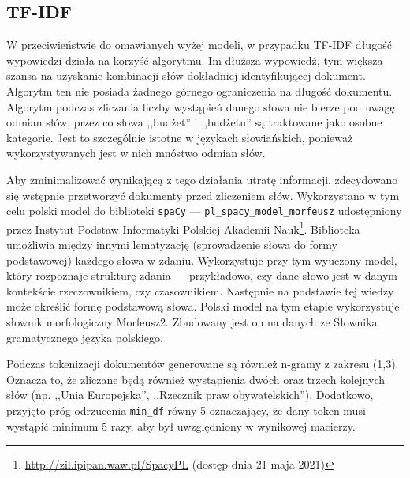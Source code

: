 	\subsection{TF-IDF}
		W przeciwieństwie do omawianych wyżej modeli, w przypadku TF-IDF długość wypowiedzi działa na korzyść algorytmu.
		Im dłuższa wypowiedź, tym większa szansa na uzyskanie kombinacji słów dokładniej identyfikującej dokument.
		Algorytm ten nie posiada żadnego górnego ograniczenia na długość dokumentu.
		Algorytm podczas zliczania liczby wystąpień danego słowa nie bierze pod uwagę odmian słów,
			przez co słowa ,,budżet'' i ,,budżetu'' są traktowane jako osobne kategorie.
		Jest to szczególnie istotne w językach słowiańskich, ponieważ wykorzystywanych jest w nich mnóstwo odmian słów.
		
		Aby zminimalizować wynikającą z tego działania utratę informacji, zdecydowano się wstępnie przetworzyć dokumenty przed zliczeniem słów.
		Wykorzystano w tym celu polski model do biblioteki \verb|spaCy|
			--- \verb|pl_spacy_model_morfeusz|\cite{spacy_pl} udostępniony przez Instytut Podstaw Informatyki Polskiej Akademii Nauk\footnote{\url{http://zil.ipipan.waw.pl/SpacyPL} (dostęp dnia 21 maja 2021)}.
		Biblioteka umożliwia między innymi lematyzację (sprowadzenie słowa do formy podstawowej) każdego słowa w zdaniu.
		Wykorzystuje przy tym wyuczony model, który rozpoznaje strukturę zdania --- przykładowo, czy dane słowo jest w danym kontekście rzeczownikiem, czy czasownikiem.
		Następnie na podstawie tej wiedzy może określić formę podstawową słowa.
		Polski model na tym etapie wykorzystuje słownik morfologiczny Morfeusz2\cite{morfeusz}.
		Zbudowany jest on na danych ze Słownika gramatycznego języka polskiego.

		Podczas tokenizacji dokumentów generowane są również n-gramy z zakresu (1,3).
		Oznacza to, że zliczane będą również wystąpienia dwóch oraz trzech kolejnych słów (np. ,,Unia Europejska'', ,,Rzecznik praw obywatelskich'').
		Dodatkowo, przyjęto próg odrzucenia \verb|min_df| równy 5 oznaczający, że dany token musi wystąpić minimum 5 razy,
			aby był uwzględniony w wynikowej macierzy.
